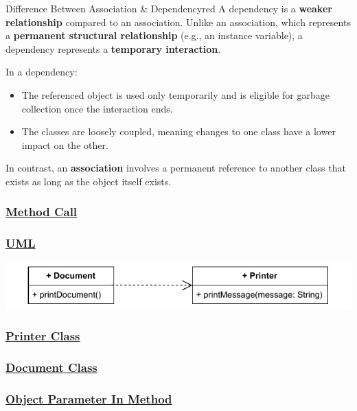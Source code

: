 \begin{prettyBox}{Difference Between Association \& Dependency}{red}
A dependency is a \textbf{weaker relationship} compared to an association. Unlike an association, which represents a \textbf{permanent structural relationship} (e.g., an instance variable), a dependency represents a \textbf{temporary interaction}. 

In a dependency:
\begin{itemize}
    \item The referenced object is used only temporarily and is eligible for garbage collection once the interaction ends.
    \item The classes are loosely coupled, meaning changes to one class have a lower impact on the other.
\end{itemize}

In contrast, an \textbf{association} involves a permanent reference to another class that exists as long as the object itself exists.
\end{prettyBox}


\subsubsection*{\underline{Method Call}}

\subsubsection*{\underline{UML}}
\includegraphics[width=\textwidth]{Chapters/Diagram/OOP/EX3/ex3.a.drawio.pdf}


\subsubsection*{\underline{Printer Class}}


\subsubsection*{\underline{Document Class}}



\subsubsection*{\underline{Object Parameter In Method}}

